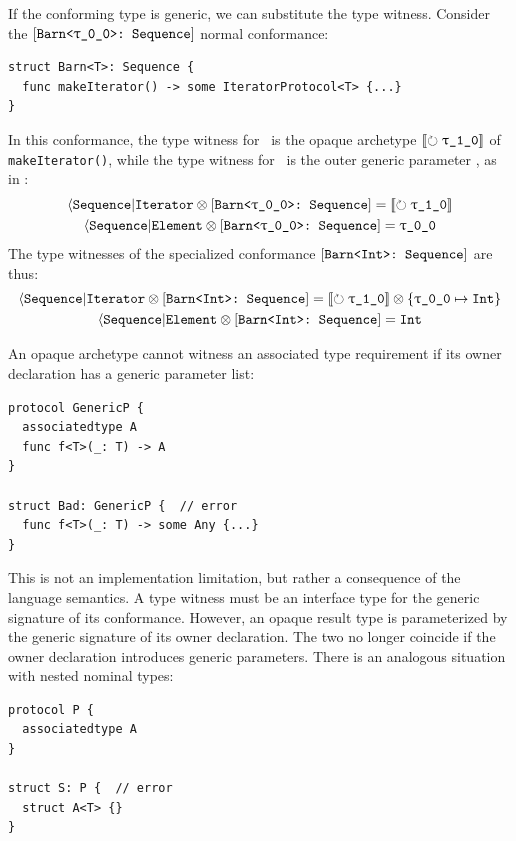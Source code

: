 \documentclass[../generics]{subfiles}
\begin{document}
\begin{example}
If the conforming type is generic, we can substitute the type witness. Consider the $\ConfReq{Barn<\rT>}{Sequence}$ normal conformance:
\begin{Verbatim}
struct Barn<T>: Sequence {
  func makeIterator() -> some IteratorProtocol<T> {...}
}
\end{Verbatim}
In this conformance, the type witness for \nIterator\ is the opaque archetype $\Oy$ of \texttt{makeIterator()}, while the type witness for \nElement\ is the outer generic parameter \rT, as in :
\begin{gather*}
\AIterator \otimes \ConfReq{Barn<\rT>}{Sequence} = \Oy \\
\AElement \otimes \ConfReq{Barn<\rT>}{Sequence} = \rT
\end{gather*}
The type witnesses of the specialized conformance $[\texttt{Barn<Int>:~Sequence}]$ are thus:
\begin{gather*}
\AIterator \otimes \ConfReq{Barn<Int>}{Sequence} = \Oy \otimes \SubstMap{\SubstType{\rT}{Int}} \\
\AElement \otimes \ConfReq{Barn<Int>}{Sequence} = \texttt{Int}
\end{gather*}
\end{example}

\begin{example}
An opaque archetype cannot witness an associated type requirement if its owner declaration has a generic parameter list:
\begin{Verbatim}
protocol GenericP {
  associatedtype A
  func f<T>(_: T) -> A
}

struct Bad: GenericP {  // error
  func f<T>(_: T) -> some Any {...}
}
\end{Verbatim}
This is not an implementation limitation, but rather a consequence of the language semantics. A type witness must be an interface type for the generic signature of its conformance. However, an opaque result type is parameterized by the generic signature of its owner declaration. The two no longer coincide if the owner declaration introduces generic parameters. There is an analogous situation with nested nominal types:
\begin{Verbatim}
protocol P {
  associatedtype A
}

struct S: P {  // error
  struct A<T> {}
}
\end{Verbatim}
\end{example}
\end{document}
